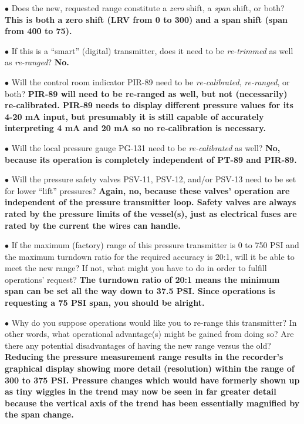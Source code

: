 \medskip
\item{$\bullet$} Does the new, requested range constitute a {\it zero} shift, a {\it span} shift, or both?  {\bf This is both a zero shift (LRV from 0 to 300) and a span shift (span from 400 to 75).}
\vskip 10pt
\item{$\bullet$} If this is a ``smart'' (digital) transmitter, does it need to be {\it re-trimmed} as well as {\it re-ranged}?  {\bf No.}
\vskip 10pt
\item{$\bullet$} Will the control room indicator PIR-89 need to be {\it re-calibrated}, {\it re-ranged}, or both? {\bf PIR-89 will need to be re-ranged as well, but not (necessarily) re-calibrated.  PIR-89 needs to display different pressure values for its 4-20 mA input, but presumably it is still capable of accurately interpreting 4 mA and 20 mA so no re-calibration is necessary.}
\vskip 10pt
\item{$\bullet$} Will the local pressure gauge PG-131 need to be {\it re-calibrated} as well?  {\bf No, because its operation is completely independent of PT-89 and PIR-89.}
\vskip 10pt
\item{$\bullet$} Will the pressure safety valves PSV-11, PSV-12, and/or PSV-13 need to be set for lower ``lift'' pressures? {\bf Again, no, because these valves' operation are independent of the pressure transmitter loop.  Safety valves are always rated by the pressure limits of the vessel(s), just as electrical fuses are rated by the current the wires can handle.}
\vskip 10pt
\item{$\bullet$} If the maximum (factory) range of this pressure transmitter is 0 to 750 PSI and the maximum turndown ratio for the required accuracy is 20:1, will it be able to meet the new range?  If not, what might you have to do in order to fulfill operations' request? {\bf The turndown ratio of 20:1 means the minimum span can be set all the way down to 37.5 PSI.  Since operations is requesting a 75 PSI span, you should be alright.}
\vskip 10pt
\item{$\bullet$} Why do you suppose operations would like you to re-range this transmitter?  In other words, what operational advantage(s) might be gained from doing so?  Are there any potential disadvantages of having the new range versus the old? {\bf Reducing the pressure measurement range results in the recorder's graphical display showing more detail (resolution) within the range of 300 to 375 PSI.  Pressure changes which would have formerly shown up as tiny wiggles in the trend may now be seen in far greater detail because the vertical axis of the trend has been essentially magnified by the span change.}
\medskip






